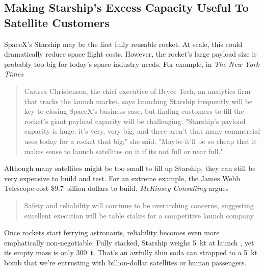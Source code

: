 \documentclass{article}
\begin{document}
{\subsection{Making Starship's Excess Capacity Useful To Satellite Customers} \label{sec:starship_safelaunch}
SpaceX's Starship may be the first fully reusable rocket. At scale, this could dramatically reduce space flight costs.   However, the rocket's large payload size is probably too big for today's space industry needs. For example, in \textit{The New York Times}
\begin{quote}
Carissa Christensen, the chief executive of Bryce Tech, an analytics firm that tracks the launch market, says launching Starship frequently will be key to closing SpaceX’s business case, but finding customers to fill the rocket’s giant payload capacity will be challenging. 
"Starship's payload capacity is huge; it's very, very big, and there aren't that many commercial uses today for a rocket that big," she said.  "Maybe it'll be so cheap that it makes sense to launch satellites on it if its not full or near full."  \cite{nyt_starship_size}
\end{quote}
Although many satellites might be too small to fill up Starship, they can still be very expensive to build and test. For an extreme example, the James Webb Telescope \cite{james_webb_space_telescope} cost \$9.7 billion dollars \cite{jwst_cost} to build. \textit{McKinsey Consulting} argues 
\begin{quote}
Safety and reliability will continue to be overarching concerns, suggesting excellent execution will be table stakes for a competitive launch company. \cite{mckinsey_reliability}
\end{quote}
Once rockets start ferrying astronauts, reliability becomes even more emphatically non-negotiable. Fully stacked, Starship weighs \SI{5}{\kilo\tonne} at launch \cite{starship}, yet its empty mass is only \SI{300}{\tonne}. That’s an awfully thin soda can strapped to a \SI{5}{\kilo\tonne} bomb that we're entrusting with billion-dollar satellites or human passengers.

}
\end{document}
